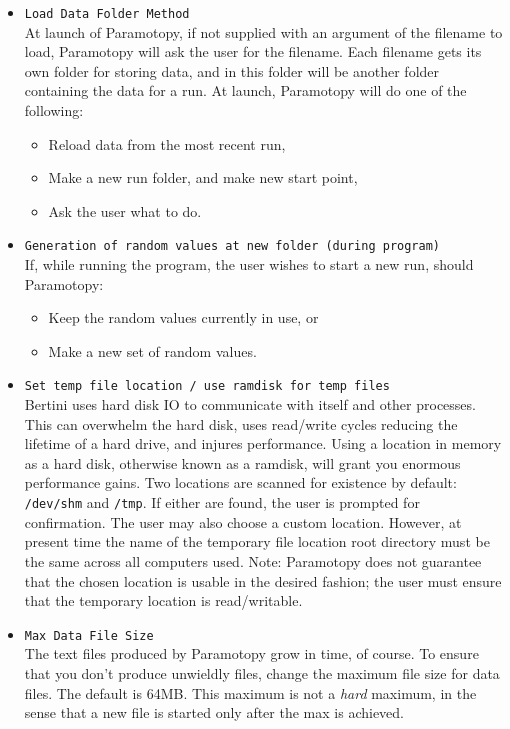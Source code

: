 \begin{itemize}
	\item \texttt{Load Data Folder Method} \\ At launch of Paramotopy, if not supplied with an argument of the filename to load, Paramotopy will ask the user for the filename.  Each filename gets its own folder for storing data, and in this folder will be another folder containing the data for a run.  At launch, Paramotopy will do one of the following:
		\begin{itemize}
			\item Reload data from the most recent run,
			\item Make a new run folder, and make new start point,
			\item Ask the user what to do.
		\end{itemize}
	\item \texttt{Generation of random values at new folder (during program)} \\ If, while running the program, the user wishes to start a new run, should Paramotopy:
		\begin{itemize}
			\item Keep the random values currently in use, or
			\item Make a new set of random values.
		\end{itemize}
	\item \texttt{Set temp file location / use ramdisk for temp files} \\ Bertini uses hard disk IO to communicate with itself and other processes.  This can overwhelm the hard disk, uses read/write cycles reducing the lifetime of a hard drive, and injures performance.  Using a location in memory as a hard disk, otherwise known as a ramdisk, will grant you enormous performance gains.  Two locations are scanned for existence by default: \texttt{/dev/shm} and \texttt{/tmp}.  If either are found, the user is prompted for confirmation.  The user may also choose a custom location.  However, at present time the name of the temporary file location root directory must be the same across all computers used.  Note: Paramotopy does not guarantee that the chosen location is usable in the desired fashion; the user must ensure that the temporary location is read/writable.
	
	
	
	\item \texttt{Max Data File Size} \\ The text files produced by Paramotopy grow in time, of course.  To ensure that you don't produce unwieldly files, change the maximum file size for data files.  The default is 64MB.  This maximum is not a \emph{hard} maximum, in the sense that a new file is started only after the max is achieved.
	

\end{itemize}
